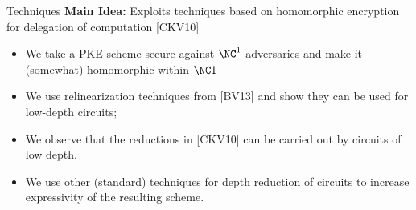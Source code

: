 \begin{frame}{Techniques}
	 \textbf{Main Idea:} Exploits techniques based on homomorphic encryption for delegation of computation [CKV10]
		\begin{itemize}[<+- | alert@+>]	
			\item We take a PKE scheme secure against $\NC^1$ adversaries and make it (somewhat) homomorphic within $\NC1$
			\item We use relinearization techniques from [BV13] and show they can be used for low-depth circuits;
			\item We observe that the reductions in [CKV10] can be carried out by circuits of low depth.
			\item We use other (standard) techniques for depth reduction of circuits to increase expressivity of the resulting scheme.
		\end{itemize} 

\end{frame}


